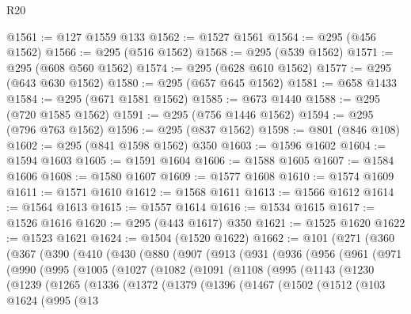 \begin{lexlean}{R20}
\begin{coremodule}
@1561 := @127 @1559 @133
@1562 := @1527 @1561
@1564 := @295 (@456 @1562)
@1566 := @295 (@516 @1562)
@1568 := @295 (@539 @1562)
@1571 := @295 (@608 @560 @1562)
@1574 := @295 (@628 @610 @1562)
@1577 := @295 (@643 @630 @1562)
@1580 := @295 (@657 @645 @1562)
@1581 := @658 @1433
@1584 := @295 (@671 @1581 @1562)
@1585 := @673 @1440
@1588 := @295 (@720 @1585 @1562)
@1591 := @295 (@756 @1446 @1562)
@1594 := @295 (@796 @763 @1562)
@1596 := @295 (@837 @1562)
@1598 := @801 (@846 @108)
@1602 := @295 (@841 @1598 @1562) @350
@1603 := @1596 @1602
@1604 := @1594 @1603
@1605 := @1591 @1604
@1606 := @1588 @1605
@1607 := @1584 @1606
@1608 := @1580 @1607
@1609 := @1577 @1608
@1610 := @1574 @1609
@1611 := @1571 @1610
@1612 := @1568 @1611
@1613 := @1566 @1612
@1614 := @1564 @1613
@1615 := @1557 @1614
@1616 := @1534 @1615
@1617 := @1526 @1616
@1620 := @295 (@443 @1617) @350
@1621 := @1525 @1620
@1622 := @1523 @1621
@1624 := @1504 (@1520 @1622)
@1662 := @101
    (@271
      (@360
        (@367
          (@390
            (@410
              (@430
                (@880
                  (@907
                    (@913
                      (@931
                        (@936
                          (@956
                            (@961
                              (@971
                                (@990
                                  (@995
                                    (@1005
                                      (@1027
                                        (@1082
                                          (@1091
                                            (@1108
                                              (@995
                                                (@1143
                                                  (@1230
                                                    (@1239
                                                      (@1265
                                                        (@1336
                                                          (@1372
                                                            (@1379
                                                              (@1396
                                                                (@1467
                                                                  (@1502
                                                                    (@1512
                                                                      (@103
                                                                        @1624
                                                                        (@995
                                                                          (@13

\end{coremodule}
\end{lexlean}
